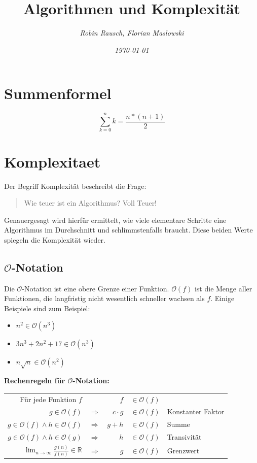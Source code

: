 \documentclass[12pt,a4paper]{article}
\author{\slshape Robin Rausch, Florian Maslowski}
\title{Algorithmen und Komplexität}
\date{\slshape \today}
\begin{document}
\maketitle
\tableofcontents
\newpage
\section{Summenformel}
\begin{equation}
	\sum^n_{k = 0} k = \frac{n * (n+1)}{2}
\end{equation}

\section{Komplexitaet}
Der Begriff Komplexität beschreibt die Frage:
\begin{quote}
	Wie teuer ist ein Algorithmus? Voll Teuer!
\end{quote}
Genauergesagt wird hierfür ermittelt, wie viele elementare Schritte eine Algorithmus im Durchschnitt und schlimmstenfalls braucht. Diese beiden Werte spiegeln die Komplexität wieder.
\subsection{$\mathcal{O}$-Notation}
Die $\mathcal{O}$-Notation ist eine obere Grenze einer Funktion. $\mathcal{O}(f)$ ist die Menge aller Funktionen, die langfristig nicht wesentlich schneller wachsen als $f$.
\newline
Einige Beispiele sind zum Beispiel:\newline
\begin{itemize}
	\item $n^2 \in \mathcal{O}(n^3)$
	\item $3n^3 + 2n^2 + 17 \in \mathcal{O}(n^3)$
	\item $n \sqrt{n} \in \mathcal{O}(n^2)$
\end{itemize}
\textbf{Rechenregeln für $\mathcal{O}$-Notation:}
\begin{center}
	\begin{tabularx}{\textwidth}{r c r c l}
		Für jede Funktion $f$ & & $f$ & $\in \mathcal{O}(f)$ & \\
		$g \in \mathcal{O}(f)$ & $\Rightarrow $ & $c \cdot g$ & $\in \mathcal{O}(f)$ & Konstanter Faktor\\
		$g \in \mathcal{O}(f) \wedge h \in \mathcal{O}(f)$ & $\Rightarrow $ & $g + h$ & $\in \mathcal{O}(f)$ & Summe\\
		$g \in \mathcal{O}(f) \wedge h \in \mathcal{O}(g)$ & $\Rightarrow $ & $h$ & $\in \mathcal{O}(f)$ & Transivität\\
		$\lim_{n \to \infty} \frac{g(n)}{f(n)} \in \mathbb{R} $ & $\Rightarrow $ & $g$ & $\in \mathcal{O}(f)$ & Grenzwert\\
	\end{tabularx}
\end{center}
\end{document}
